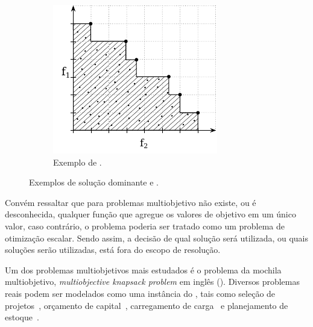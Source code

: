 \begin{figure}[H]
\begin{subfigure}[t]{0.3\textwidth}
        \includegraphics[width=\textwidth]{img/mokp/pareto-def}
        \caption{Exemplo de \paretoset{}.}
        \label{fig:eff-def}
    \end{subfigure}
    \caption{Exemplos de solução dominante e \paretoset{}.}
    \label{fig:mo-defs}
\end{figure}

Convém ressaltar que para problemas multiobjetivo não existe, ou é desconhecida,
qualquer função que agregue os valores de objetivo em um único valor,
caso contrário, o problema poderia ser tratado como um problema de 
otimização escalar.
Sendo assim, a decisão de qual solução será utilizada,
ou quais soluções serão utilizadas, está fora do escopo de resolução.

Um dos problemas multiobjetivos mais estudados
é o problema da mochila multiobjetivo, \emph{multiobjective knapsack problem} em inglês (\mokp{}).
Diversos problemas reais podem ser modelados como uma instância do \mokp{}, tais 
como seleção de projetos~\cite{teng1996multiobjective},
orçamento de capital~\cite{rosenblatt1989generating},
carregamento de carga~\cite{teng1996multiobjective}
e planejamento de estoque~\cite{ishibuchi2015behavior}.

